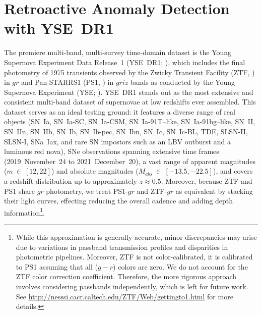 \documentclass[twocolumn]{aastex63}
\begin{document}
\section{Retroactive Anomaly Detection with YSE~DR1} \label{sec:AD_ysedr1}

The premiere multi-band, multi-survey time-domain dataset is the Young Supernova Experiment Data Release~1 (YSE~DR1; \citealt{Aleo2023}), which includes the final photometry of 1975 transients observed by the Zwicky Transient Facility (ZTF, \citealt{Bellm2019}) in $gr$ and Pan-STARRS1 (PS1, \citealt{Chambers2016}) in $griz$ bands as conducted by the Young Supernova Experiment (YSE; \citealt{Jones2021}). YSE~DR1 stands out as the most extensive and consistent multi-band dataset of supernovae at low redshifts ever assembled. This dataset serves as an ideal testing ground: it features a diverse range of real objects (SN~Ia, SN~Ia-SC, SN~Ia-CSM, SN~Ia-91T–like, SN~Ia-91bg–like, SN~II, SN~IIn, SN~IIb, SN~Ib, SN~Ib-pec, SN~Ibn, SN~Ic, SN~Ic-BL, TDE, SLSN-II, SLSN-I, SNa~Iax, and rare SN impostors such as an LBV outburst and a luminous red nova), SNe observations spanning extensive time frames (2019~November~24 to 2021~December~20), a vast range of apparent magnitudes ($m~\in~[12, 22]$) and absolute magnitudes ($M_{abs}~\in~[-13.5, -22.5]$), and covers a redshift distribution up to approximately $z\approx0.5$. Moreover, because ZTF and PS1 share $gr$ photometry, we treat PS1-$gr$ and ZTF-$gr$ as equivalent by stacking their light curves, effecting reducing the overall cadence and adding depth information\footnote{While this approximation is generally accurate, minor discrepancies may arise due to variations in passband transmission profiles and disparities in photometric pipelines. Moreover, ZTF is not color-calibrated, it is calibrated to PS1 assuming that all ($g-r$) colors are zero. We do not account for the ZTF color correction coefficient. Therefore, the more rigorous approach involves considering passbands independently, which is left for future work. See \url{http://nesssi.cacr.caltech.edu/ZTF/Web/gettingto1.html} for more details.}. \par %
\end{document}
